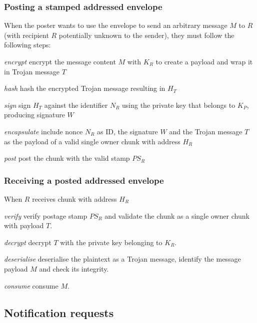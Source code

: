 \subsubsection{Posting a stamped addressed envelope}

When the poster wants to use the envelope to send an arbitrary message $M$ to $R$ (with recipient $R$ potentially unknown to the sender), they must follow the following steps:

\begin{labelledlist}
\item[\emph{encrypt}] encrypt the message content $M$ with $K_R$ to create a payload and wrap it in Trojan message $T$
\item[\emph{hash}] hash the encrypted Trojan message resulting in $H_T$
\item[\emph{sign}] sign $H_T$ against the identifier $N_R$ using the private key that belongs to $K_P$, producing signature $W$
\item[\emph{encapsulate}] include nonce $N_R$ as ID, the signature $W$ and the Trojan message $T$ as the payload of a valid single owner chunk with address $H_R$
\item[\emph{post}] post the chunk with the valid stamp $PS_R$
\end{labelledlist}

\subsubsection{Receiving a posted addressed envelope}

When $R$ receives chunk with address $H_R$

\begin{labelledlist}
\item[\emph{verify}] verify postage stamp $PS_R$ and validate the chunk as a single owner chunk with payload $T$.
\item[\emph{decrypt}] decrypt $T$ with the private key belonging to $K_R$.
\item[\emph{deserialise}] deserialise the plaintext as a Trojan message, identify the message payload $M$ and check its integrity.
\item[\emph{consume}] consume $M$.
\end{labelledlist}

\subsection{Notification requests\statusgreen}\label{sec:notification-requests} 

